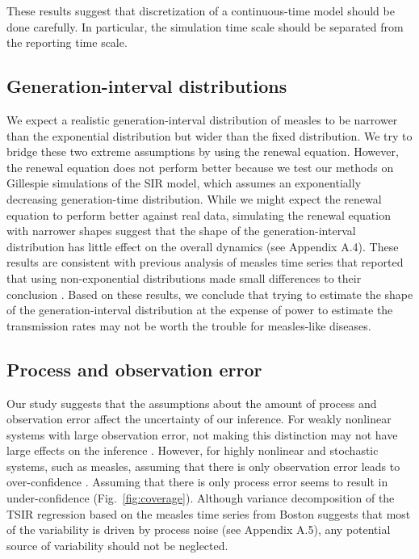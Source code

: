 \documentclass{article}
\newcommand{\fref}[1]{Fig.~\ref{fig:#1}}
\begin{document}
These results suggest that discretization of a continuous-time model should be done carefully.
In particular, the simulation time scale should be separated from the reporting time scale.


\subsection{Generation-interval distributions}

We expect a realistic generation-interval distribution of measles to be narrower than the exponential distribution but wider than the fixed distribution.
We try to bridge these two extreme assumptions by using the renewal equation.
However, the renewal equation does not perform better because we test our methods on Gillespie simulations of the SIR model, which assumes an exponentially decreasing generation-time distribution.
While we might expect the renewal equation to perform better against real data, simulating the renewal equation with narrower shapes suggest that the shape of the generation-interval distribution has little effect on the overall dynamics (see Appendix A.4).
These results are consistent with previous analysis of measles time series that reported that using non-exponential distributions made small differences to their conclusion \citep{he2009plug}.
Based on these results, we conclude that trying to estimate the shape of the generation-interval distribution at the expense of power to estimate the transmission rates may not be worth the trouble for measles-like diseases.

\subsection{Process and observation error}

Our study suggests that the assumptions about the amount of process and observation error affect the uncertainty of our inference.
For weakly nonlinear systems with large observation error, not making this distinction may not have large effects on the inference \citep{ma2014estimating}.
However, for highly nonlinear and stochastic systems, such as measles, assuming that there is only observation error leads to over-confidence \citep{king2015avoidable, taylor2016stochasticity}.
Assuming that there is only process error seems to result in under-confidence (\fref{coverage}).
Although variance decomposition of the TSIR regression based on the measles time series from Boston suggests that most of the variability is driven by process noise (see Appendix A.5), 
any potential source of variability should not be neglected.
\end{document}
